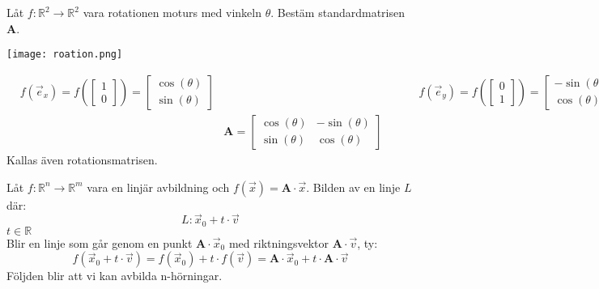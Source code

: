 \begin{Ex}
	Låt $f: \mathbb{R}^2 \rightarrow \mathbb{R}^2$ vara rotationen moturs med vinkeln $\theta$. Bestäm standardmatrisen $\mathbf{A}$.
	\begin{center}
		\texttt{[image: roation.png]}	    	
	\end{center}	
	\begin{align*}
	&f(\vec{e}_x) = f(\begin{bmatrix} 1\\0 \end{bmatrix}) = \begin{bmatrix} \cos(\theta)\\\sin(\theta) \end{bmatrix} && &&&f(\vec{e}_y) = f(\begin{bmatrix} 0\\1 \end{bmatrix}) = \begin{bmatrix} -\sin(\theta)\\\cos(\theta) \end{bmatrix}\\
	&&\mathbf{A} = \begin{bmatrix} \cos(\theta)&-\sin(\theta)\\\sin(\theta)&\cos(\theta) \end{bmatrix}
	\end{align*}
	Kallas även rotationsmatrisen.
\end{Ex}
\noindent
Låt $f: \mathbb{R}^n \rightarrow \mathbb{R}^m$ vara en linjär avbildning och $f(\vec{x}) = \mathbf{A} \cdot \vec{x}$. Bilden av en linje $L$ där:
\[
    L: \vec{x}_0 + t \cdot \vec{v}
\]
$t\in \mathbb{R}$\\
Blir en linje som går genom en punkt $\mathbf{A} \cdot \vec{x}_0$ med riktningsvektor $\mathbf{A} \cdot \vec{v}$, ty:
\[
    f(\vec{x}_0 + t \cdot \vec{v}) = f(\vec{x}_0) + t \cdot f(\vec{v}) = \mathbf{A} \cdot \vec{x}_0 + t \cdot \mathbf{A} \cdot \vec{v}
\]
Följden blir att vi kan avbilda n-hörningar.
